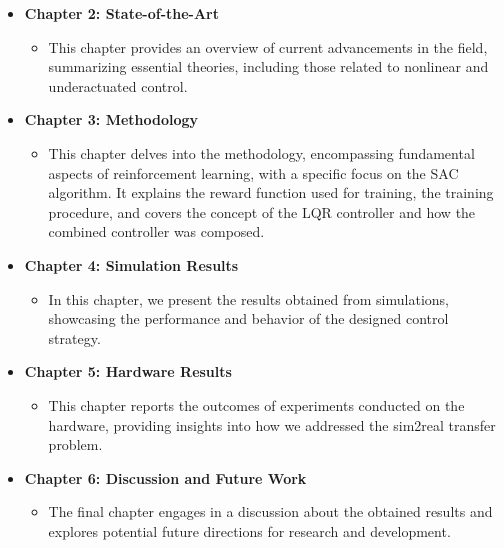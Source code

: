 \begin{itemize}
  \item \textbf{Chapter 2: State-of-the-Art}
  \begin{itemize}
    \item This chapter provides an overview of current advancements in the field, summarizing essential theories, including those related to nonlinear and underactuated control.
  \end{itemize}
  
  \item \textbf{Chapter 3: Methodology}
  \begin{itemize}
    \item This chapter delves into the methodology, encompassing fundamental aspects of reinforcement learning, with a specific focus on the SAC algorithm. It explains the reward function used for training, the training procedure, and covers the concept of the LQR controller and how the combined controller was composed.
  \end{itemize}
  
  \item \textbf{Chapter 4: Simulation Results}
  \begin{itemize}
    \item In this chapter, we present the results obtained from simulations, showcasing the performance and behavior of the designed control strategy.
  \end{itemize}
  
  \item \textbf{Chapter 5: Hardware Results}
  \begin{itemize}
    \item This chapter reports the outcomes of experiments conducted on the hardware, providing insights into how we addressed the sim2real transfer problem.
  \end{itemize}
  
  \item \textbf{Chapter 6: Discussion and Future Work}
  \begin{itemize}
    \item The final chapter engages in a discussion about the obtained results and explores potential future directions for research and development.
  \end{itemize}
\end{itemize}

\cleardoublepage

